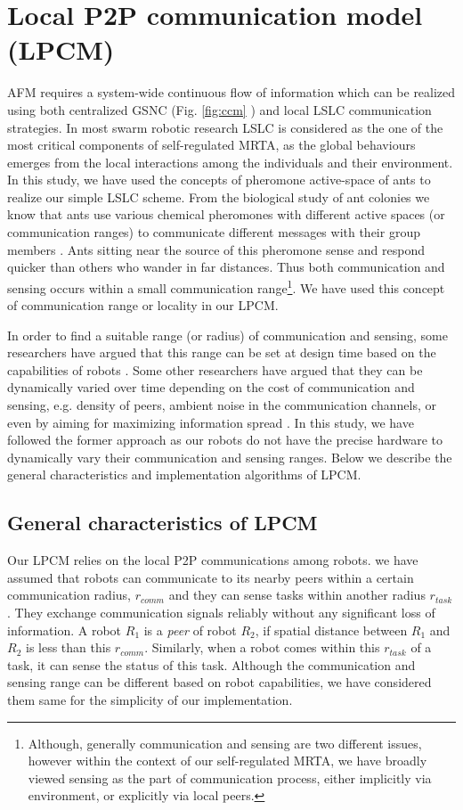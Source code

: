 \documentclass[final,5p,times,twocolumn]{elsarticle}
\begin{document}
\section{Local P2P communication model (LPCM)}
AFM requires a system-wide continuous flow of information which can be realized using both centralized GSNC (Fig. \ref{fig:ccm} ) and local LSLC communication strategies. In most swarm robotic research LSLC is considered as the one of the most critical components of self-regulated MRTA, as the global behaviours emerges from the local interactions among the individuals and their environment. In this study, we have used the concepts of pheromone active-space of ants to realize our simple LSLC scheme. From the biological study of ant colonies we know that ants use various chemical pheromones with different active spaces (or communication ranges) to communicate different messages with their group members \cite{Holldobler1990}. Ants sitting near the source of this pheromone sense and respond quicker than others who wander in far distances. Thus both communication and sensing occurs within a small communication range\footnote{Although, generally communication and sensing are two different issues, however within the context of our self-regulated MRTA, we have broadly viewed sensing as the part of communication process, either implicitly via environment, or explicitly via local peers.}. We have used this concept of communication range or locality in our LPCM.

In order to find a suitable  range (or radius) of communication and sensing, some researchers have argued that this range can be set at design time based on the capabilities of robots \cite{Agassounon+2002}. Some other researchers have argued that they can be dynamically varied over time depending on the  cost of communication and sensing, e.g. density of peers, ambient noise in the communication channels, or even by aiming for maximizing information spread  \cite{Yoshida+2000}. In this study, we have followed the former approach as our robots do not have the precise hardware to dynamically vary their communication and sensing ranges. Below we describe the general characteristics and implementation algorithms of LPCM.
\subsection{General characteristics of LPCM}
Our LPCM relies on the local P2P communications among robots. we have assumed that robots can communicate to its nearby peers within a certain communication radius, $r_{comm}$ and they can sense tasks within another radius $r_{task}$. They exchange communication signals reliably without any significant loss of information. A robot $R_1$ is a {\em peer} of robot $R_2$, if spatial distance between $R_1$ and $R_2$ is less than this $r_{comm}$.
Similarly, when a robot comes within this $r_{task}$ of a task, it can sense the status of this task. Although the communication and sensing  range can be different based on robot capabilities, we have considered them same for the simplicity of our implementation.
\end{document}
